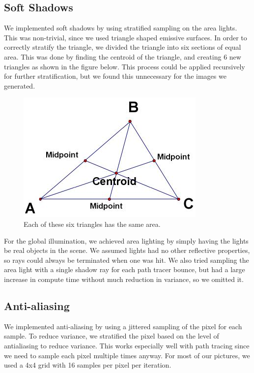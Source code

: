 \documentclass[11pt]{article}
\begin{document}
\subsection{Soft Shadows}
We implemented soft shadows by using stratified sampling on the area lights. This was non-trivial, since we used triangle shaped emissive surfaces. In order to correctly stratify the triangle, we divided the triangle into six sections of equal area. This was done by finding the centroid of the triangle, and creating 6 new triangles as shown in the figure below. This process could be applied recursively for further stratification, but we found this unnecessary for the images we generated.

\begin{figure}
	\begin{center}
		\includegraphics[width=.5\linewidth]{figs/centroid}
		\caption{Each of these six triangles has the same area.}
	\end{center}
\end{figure}

For the global illumination, we achieved area lighting by simply having the lights be real objects in the scene. We assumed lights had no other reflective properties, so rays could always be terminated when one was hit. We also tried sampling the area light with a single shadow ray for each path tracer bounce, but had a large increase in compute time without much reduction in variance, so we omitted it.

\subsection{Anti-aliasing}

We implemented anti-aliasing by using a jittered sampling of the pixel for each sample. To reduce variance, we stratified the pixel based on the level of antialiasing to reduce variance. This works especially well with path tracing since we need to sample each pixel multiple times anyway. For most of our pictures, we used a 4x4 grid with 16 samples per pixel per iteration. 
\end{document}
